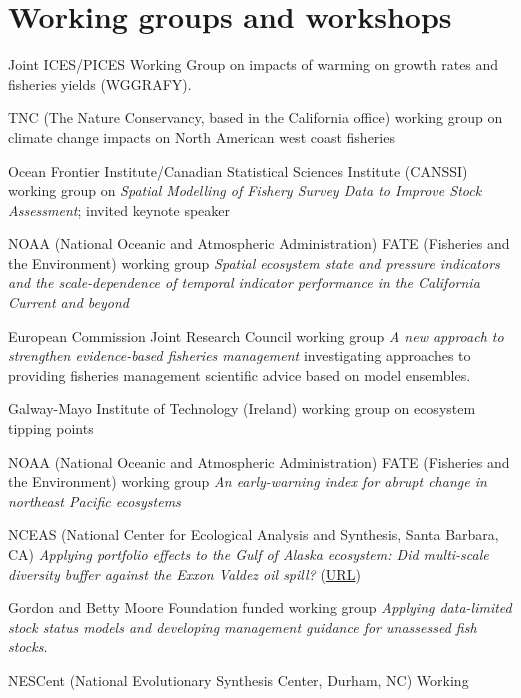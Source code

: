 \section{Working groups and
workshops}\label{working-groups-and-workshops}

\begin{description}
\tightlist
\item[2020--23]
Joint ICES/PICES Working Group on impacts of warming on growth rates and
fisheries yields (WGGRAFY).
\item[2020--22]
TNC (The Nature Conservancy, based in the California office) working
group on climate change impacts on North American west coast fisheries
\item[2020]
Ocean Frontier Institute/Canadian Statistical Sciences Institute
(CANSSI) working group on \emph{Spatial Modelling of Fishery Survey Data
to Improve Stock Assessment}; invited keynote speaker
\item[2019--20]
NOAA (National Oceanic and Atmospheric Administration) FATE (Fisheries
and the Environment) working group \emph{Spatial ecosystem state and
pressure indicators and the scale-dependence of temporal indicator
performance in the California Current and beyond}
\item[2018--19]
European Commission Joint Research Council working group \emph{A new
approach to strengthen evidence-based fisheries management}
investigating approaches to providing fisheries management scientific
advice based on model ensembles.
\item[2018]
Galway-Mayo Institute of Technology (Ireland) working group on ecosystem
tipping points
\item[2016--17]
NOAA (National Oceanic and Atmospheric Administration) FATE (Fisheries
and the Environment) working group \emph{An early-warning index for
abrupt change in northeast Pacific ecosystems}
\item[2015--16]
NCEAS (National Center for Ecological Analysis and Synthesis, Santa
Barbara, CA) \emph{Applying portfolio effects to the Gulf of Alaska
ecosystem: Did multi-scale diversity buffer against the Exxon Valdez oil
spill?} (\href{https://www.nceas.ucsb.edu/featured/marshall}{URL})
\item[2015--16]
Gordon and Betty Moore Foundation funded working group \emph{Applying
data-limited stock status models and developing management guidance for
unassessed fish stocks}.
\item[2011--13]
NESCent (National Evolutionary Synthesis Center, Durham, NC) Working

\end{description}
